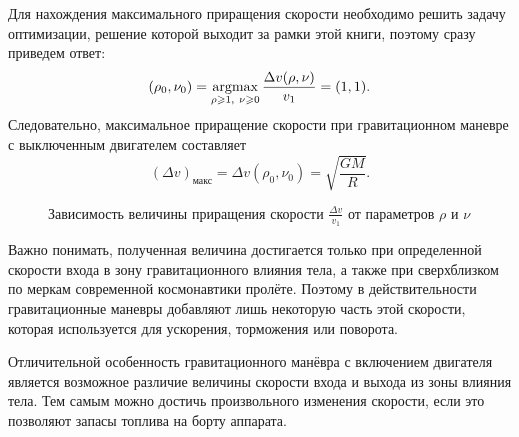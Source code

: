 Для нахождения максимального приращения скорости необходимо решить задачу оптимизации, решение которой выходит за рамки этой книги, поэтому сразу приведем ответ:
\begin{equation*}
    (\rho_0, \nu_0)
        = \underset{\rho \geqslant 1,~\nu \geqslant 0} {\operatorname{argmax}}\, \frac{\Delta v (\rho, \nu)}{v_1} 
        = (1, 1).
\end{equation*}
Следовательно, максимальное приращение скорости при гравитационном маневре с выключенным двигателем составляет
\begin{equation*}
    (\Delta v)_\text{макс}
        = \Delta v (\rho_0, \nu_0)
        = \sqrt{\frac{G M}{R}}.
\end{equation*}

\begin{wrapfigure}[11]{r}{0.45\tw}
    \vspace{-1.2pc}
	\caption{Зависимость величины приращения скорости $\frac{\Delta v}{v_1}$ от параметров $\rho$ и $\nu$}
\end{wrapfigure}
Важно понимать, полученная величина достигается только при определенной скорости входа в зону гравитационного влияния тела, а также при сверхблизком по меркам современной космонавтики пролёте. Поэтому в действительности гравитационные маневры добавляют лишь некоторую часть этой скорости, которая используется для ускорения, торможения или поворота.

Отличительной особенность гравитационного манёвра с включением двигателя является возможное различие величины скорости входа и выхода из зоны влияния тела. Тем самым можно достичь произвольного изменения скорости, если это позволяют запасы топлива на борту аппарата.

